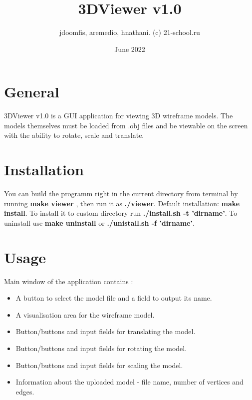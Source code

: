 \documentclass{article}
\title{3DViewer v1.0}
\author{jdoomfis, aremedio, hnathani. (c) 21-school.ru}
\date{June 2022}
\begin{document}
\maketitle

\section{General}
3DViewer v1.0 is a GUI application for viewing 3D wireframe models. The models themselves must be loaded from .obj files and be viewable on the screen with the ability to rotate, scale and translate.
\section{Installation}
You can build the programm right in the current directory from terminal by running \textbf{make viewer} , then run it as \textbf{./viewer}.
Default installation: \textbf{make install}.
To install it to custom directory run \textbf{./install.sh -t 'dirname'}.
To uninstall use \textbf{make uninstall} or \textbf{./unistall.sh -f 'dirname'}.

\section{Usage}
Main window of the application contains :
\begin{itemize}
\item A button to select the model file and a field to output its name.
\item A visualisation area for the wireframe model.
\item Button/buttons and input fields for translating the model.
\item Button/buttons and input fields for rotating the model.
\item Button/buttons and input fields for scaling the model.
\item Information about the uploaded model - file name, number of vertices and edges.
\end{itemize}
\end{document}
